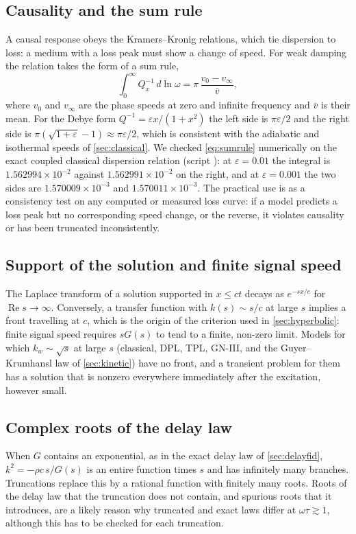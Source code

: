 \subsection{Causality and the sum rule}
A causal response obeys the Kramers--Kronig relations, which tie dispersion to loss: a medium with a loss peak must show a change of speed. For weak damping the relation takes the form of a sum rule,
\begin{equation}\label{eq:sumrule}
\int_0^\infty Q_x^{-1}\,d\ln\omega=\pi\,\frac{v_0-v_\infty}{\bar v},
\end{equation}
where $v_0$ and $v_\infty$ are the phase speeds at zero and infinite frequency and $\bar v$ is their mean. For the Debye form $Q^{-1}=\varepsilon x/(1+x^2)$ the left side is $\pi\varepsilon/2$ and the right side is $\pi(\sqrt{1+\varepsilon}-1)\approx\pi\varepsilon/2$, which is consistent with the adiabatic and isothermal speeds of \cref{sec:classical}. We checked \cref{eq:sumrule} numerically on the exact coupled classical dispersion relation (script ): at $\varepsilon=0.01$ the integral is $1.562994\times10^{-2}$ against $1.562991\times10^{-2}$ on the right, and at $\varepsilon=0.001$ the two sides are $1.570009\times10^{-3}$ and $1.570011\times10^{-3}$. The practical use is as a consistency test on any computed or measured loss curve: if a model predicts a loss peak but no corresponding speed change, or the reverse, it violates causality or has been truncated inconsistently.

\subsection{Support of the solution and finite signal speed}
The Laplace transform of a solution supported in $x\le ct$ decays as $e^{-sx/c}$ for $\operatorname{Re}s\to\infty$. Conversely, a transfer function with $k(s)\sim s/c$ at large $s$ implies a front travelling at $c$, which is the origin of the criterion used in \cref{sec:hyperbolic}: finite signal speed requires $sG(s)$ to tend to a finite, non-zero limit. Models for which $k_w\sim\sqrt{s}$ at large $s$ (classical, DPL, TPL, GN-III, and the Guyer--Krumhansl law of \cref{sec:kinetic}) have no front, and a transient problem for them has a solution that is nonzero everywhere immediately after the excitation, however small.

\subsection{Complex roots of the delay law}
When $G$ contains an exponential, as in the exact delay law of \cref{sec:delayfid}, $k^2=-\rho c\,s/G(s)$ is an entire function times $s$ and has infinitely many branches. Truncations replace this by a rational function with finitely many roots. Roots of the delay law that the truncation does not contain, and spurious roots that it introduces, are a likely reason why truncated and exact laws differ at $\omega\tau\gtrsim1$, although this has to be checked for each truncation.

